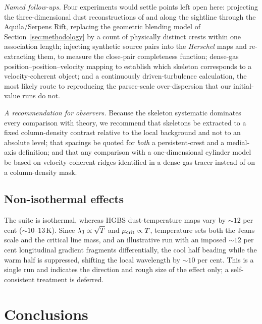 \documentclass[usenatbib,twoside,twocolumn]{mnras}
\begin{document}
\smallskip\noindent\emph{Named follow-ups.} Four experiments would settle points left open here: projecting the three-dimensional dust reconstructions of \citet{Zucker2020} and \citet{Green2024} along the sightline through the Aquila/Serpens Rift, replacing the geometric blending model of Section~\ref{sec:methodology} by a count of physically distinct crests within one association length; injecting synthetic source pairs into the \textit{Herschel} maps and re-extracting them, to measure the close-pair completeness function; dense-gas position--position--velocity mapping to establish which skeleton corresponds to a velocity-coherent object; and a continuously driven-turbulence calculation, the most likely route to reproducing the parsec-scale over-dispersion that our initial-value runs do not.

\smallskip\noindent\emph{A recommendation for observers.} Because the skeleton systematic dominates every comparison with theory, we recommend that skeletons be extracted to a fixed column-density contrast relative to the local background and not to an absolute level; that spacings be quoted for \emph{both} a persistent-crest and a medial-axis definition; and that any comparison with a one-dimensional cylinder model be based on velocity-coherent ridges identified in a dense-gas tracer instead of on a column-density mask.



\subsection{Non-isothermal effects}
\label{sec:mt_variation}

The suite is isothermal, whereas HGBS dust-temperature maps vary by $\sim12$ per cent ($\sim10$--$13$\,K). Since $\lambda_{\rm J}\propto\sqrt{T}$ and $\mu_{\rm crit}\propto T$, temperature sets both the Jeans scale and the critical line mass, and an illustrative run with an imposed $\sim12$ per cent longitudinal gradient fragments differentially, the cool half beading while the warm half is suppressed, shifting the local wavelength by $\sim10$ per cent. This is a single run and indicates the direction and rough size of the effect only; a self-consistent treatment is deferred.



\section{Conclusions}
\end{document}

